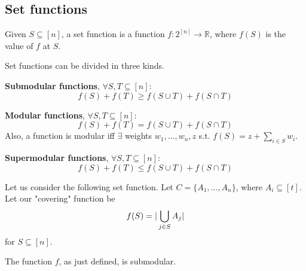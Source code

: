\subsection{Set functions}
    Given $S \subseteq [n]$, a set function is a function $f : 2^{[n]} \rightarrow \mathbb{R}$, where $f(S)$ is the value of $f$ at $S$.

    Set functions can be divided in three kinds.

    \textbf{Submodular functions}, $\forall S,T \subseteq [n]$:
    \[ f(S) + f(T) \geq f(S \cup T) + f(S \cap T) \]

    \textbf{Modular functions}, $\forall S,T \subseteq [n]$:
    \[ f(S) + f(T) = f(S \cup T) + f(S \cap T) \]
    Also, a function is modular iff $\exists$ weights $w_1, \dots, w_n, z$ s.t. $f(S) = z + \sum_{i \in S} w_i$.

    \textbf{Supermodular functions}, $\forall S,T \subseteq [n]$:
    \[ f(S) + f(T) \leq f(S \cup T) + f(S \cap T) \]

    Let us consider the following set function.
    Let $C = \{ A_1, \dots, A_n \}$, where $A_i \subseteq [t]$.
    Let our "covering" function be
    \[ f(S) = \vert \bigcup_{j \in S} A_j \vert \]
    for $S \subseteq [n]$.

    \begin{theorem}
        The function $f$, as just defined, is submodular.
    \end{theorem}

